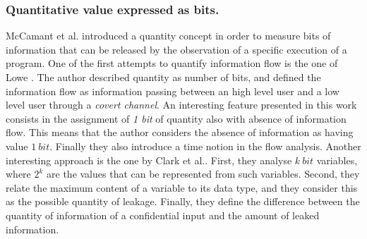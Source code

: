 \documentclass{llncs}
\begin{document}
\subsubsection{Quantitative value expressed as bits.}
McCamant et al. \cite{McCamant06,McCamant08} introduced a quantity concept in order to measure bits of information that can be released by the observation of a specific execution of a program.  One of the first attempts to quantify information flow is the one of Lowe \cite{Lowe02}. The author described quantity as number of bits, and defined the information flow as information passing between an high level user and a low level user through a \emph{covert channel}. An interesting feature presented in this work consists in the assignment of \emph{1 bit} of quantity also with absence of information flow. This means that the author considers the absence of information as having value $1\ bit$. Finally they also introduce a time notion in the flow analysis.
Another interesting approach is the one by Clark et al.\cite{city191,Clark04}.  First, they analyse $k\ bit$ variables, where $2^k$ are the values that can be represented from such variables. Second, they relate the maximum content of a variable to its data type, and they consider this as the possible quantity of leakage. Finally, they define the difference between the quantity of information of a confidential input and the amount of leaked information.
\end{document}
